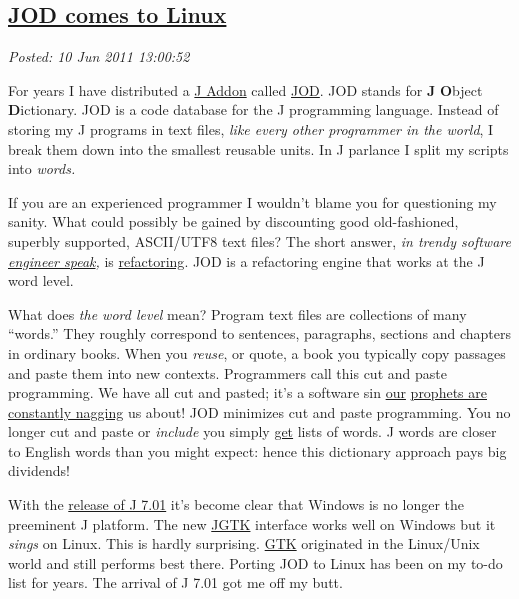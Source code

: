 %

\subsection*{\href{http://bakerjd99.wordpress.com/2011/06/10/jod-comes-to-linux/}{JOD comes to Linux}}


\noindent\emph{Posted: 10 Jun 2011 13:00:52}
\vspace{6pt}

For years I have distributed a
\href{http://www.jsoftware.com/jwiki/Addons}{J Addon} called
\href{http://bakerjd99.wordpress.com/the-jod-page/}{JOD}. JOD stands for
\textbf{J} \textbf{O}bject \textbf{D}ictionary. JOD is a code database
for the J programming language. Instead of storing my J programs in text
files, \emph{like every other programmer in the world}, I break them
down into the smallest reusable units. In J parlance I split my scripts
into \emph{words.}

If you are an experienced programmer I wouldn't blame you for
questioning my sanity. What could possibly be gained by discounting good
old-fashioned, superbly supported, ASCII/UTF8 text files? The short
answer, \emph{in trendy software
\href{http://ee.cleversoul.com/fun/engspeak.html}{engineer speak},} is
\href{http://c2.com/cgi/wiki?WhatIsRefactoring}{refactoring}. JOD is a
refactoring engine that works at the J word level.

What does \emph{the word level} mean? Program text files are collections
of many ``words.'' They roughly correspond to sentences, paragraphs,
sections and chapters in ordinary books. When you \emph{reuse}, or
quote, a book you typically copy passages and paste them into new
contexts. Programmers call this cut and paste programming. We have all
cut and pasted; it's a software sin
\href{http://c2.com/cgi/wiki?CopyAndPasteProgramming}{our} \href{http://c2.com/cgi/wiki?CopyAndPasteProgramming}{prophets
are constantly nagging} us about! JOD minimizes cut and paste
programming. You no longer cut and paste or \emph{include} you simply
\href{https://docs.google.com/document/d/1Vk-PQrdPEISp0SL4eDaGDgg5HpATarPPvXHryC12I8M/edit?hl=en\_US\&pli=1\#}{get}
lists of words. J words are closer to English words than you might
expect: hence this dictionary approach pays big dividends!

With the
\href{http://bakerjd99.wordpress.com/2011/02/12/j-7-01-now-playing-in-your-browser/}{release
of J 7.01} it's become clear that Windows is no longer the preeminent J
platform. The new
\href{http://www.jsoftware.com/jwiki/System/Installation/J701/Gtk\#Install}{JGTK}
interface works well on Windows but it \emph{sings} on Linux. This is
hardly surprising. \href{http://www.gtk.org/}{GTK} originated in the
Linux/Unix world and still performs best there. Porting JOD to Linux has
been on my to-do list for years. The arrival of J 7.01 got me off my
butt.

